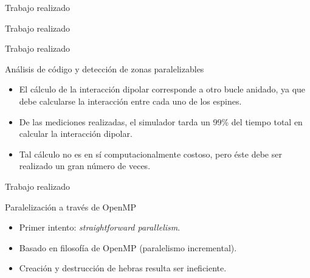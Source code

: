 \begin{frame}
\vfill
\begin{center}
\begin{block}{\begin{center}\begin{Huge}Trabajo realizado\end{Huge}\end{center}}
\end{block}
\end{center}
\end{frame}

\begin{frame}{Trabajo realizado}
\centerline{
      }
\end{frame}

\begin{frame}{Trabajo realizado}
\begin{block}{Análisis de código y detección de zonas paralelizables}
\begin{itemize}
  \item El cálculo de la interacción dipolar corresponde a otro bucle anidado, ya que debe calcularse la interacción entre cada uno de los espines.
  \item De las mediciones realizadas, el simulador tarda un 99\% del tiempo total en calcular la interacción dipolar.
  \item Tal cálculo no es en sí computacionalmente costoso, pero éste debe ser realizado un gran número de veces.
\end{itemize}
\centerline{
      }
\end{block}

\end{frame}
\begin{frame}{Trabajo realizado}
\begin{block}{Paralelización a través de OpenMP}
\begin{itemize}
  \item Primer intento: \textit{straightforward parallelism}.
  \item Basado en filosofía de OpenMP (paralelismo incremental).
  \item Creación y destrucción de hebras resulta ser ineficiente.
\end{itemize}
\end{block}
\end{frame}

